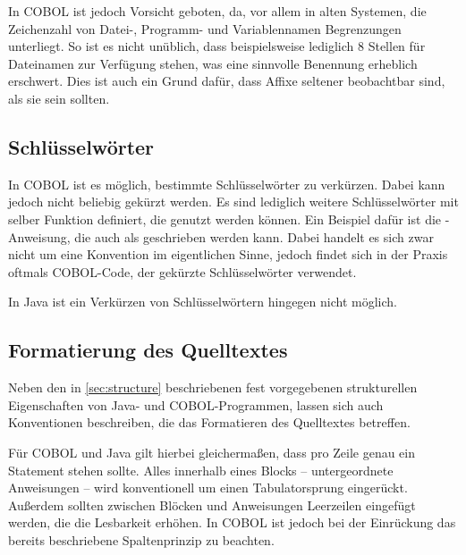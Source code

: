 In COBOL ist jedoch Vorsicht geboten, da, vor allem in alten Systemen, die Zeichenzahl von Datei-, Programm- und Variablennamen Begrenzungen unterliegt. So ist es nicht unüblich, dass beispielsweise lediglich 8 Stellen für Dateinamen zur Verfügung stehen, was eine sinnvolle Benennung erheblich erschwert. Dies ist auch ein Grund dafür, dass Affixe seltener beobachtbar sind, als sie sein sollten.

\subsection*{Schlüsselwörter}
In COBOL ist es möglich, bestimmte Schlüsselwörter zu verkürzen. Dabei kann jedoch nicht beliebig gekürzt werden. Es sind lediglich weitere Schlüsselwörter mit selber Funktion definiert, die genutzt werden können. Ein Beispiel dafür ist die -Anweisung, die auch als  geschrieben werden kann. Dabei handelt es sich zwar nicht um eine Konvention im eigentlichen Sinne, jedoch findet sich in der Praxis oftmals COBOL-Code, der gekürzte Schlüsselwörter verwendet.

In Java ist ein Verkürzen von Schlüsselwörtern hingegen nicht möglich.

\subsection*{Formatierung des Quelltextes}

Neben den in \autoref{sec:structure} beschriebenen fest vorgegebenen strukturellen Eigenschaften von Java- und COBOL-Programmen, lassen sich auch Konventionen beschreiben, die das Formatieren des Quelltextes betreffen.

Für COBOL und Java gilt hierbei gleichermaßen, dass pro Zeile genau ein Statement stehen sollte. Alles innerhalb eines Blocks -- untergeordnete Anweisungen -- wird konventionell um einen Tabulatorsprung eingerückt. Außerdem sollten zwischen Blöcken und Anweisungen Leerzeilen eingefügt werden, die die Lesbarkeit erhöhen. In COBOL ist jedoch bei der Einrückung das bereits beschriebene Spaltenprinzip zu beachten.